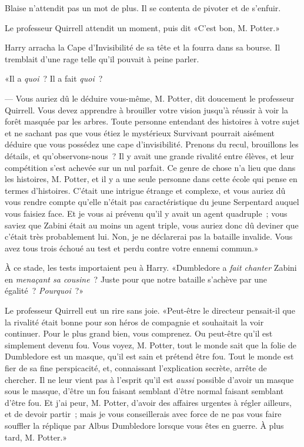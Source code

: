 Blaise n'attendit pas un mot de plus. Il se contenta de pivoter et de s'enfuir.

\later

Le professeur Quirrell attendit un moment, puis dit «C'est bon, M. Potter.»

Harry arracha la Cape d'Invisibilité de sa tête et la fourra dans sa bourse. Il tremblait d'une rage telle qu'il pouvait à peine parler.

«Il a \emph{quoi}~? Il a fait \emph{quoi}~?

--- Vous auriez dû le déduire vous-même, M. Potter, dit doucement le professeur Quirrell. Vous devez apprendre à brouiller votre vision jusqu'à réussir à voir la forêt masquée par les arbres. Toute personne entendant des histoires à votre sujet et ne sachant pas que vous étiez le mystérieux Survivant pourrait aisément déduire que vous possédez une cape d'invisibilité. Prenons du recul, brouillons les détails, et qu'observons-nous~? Il y avait une grande rivalité entre élèves, et leur compétition s'est achevée sur un nul parfait. Ce genre de chose n'a lieu que dans les histoires, M. Potter, et il y a une seule personne dans cette école qui pense en termes d'histoires. C'était une intrigue étrange et complexe, et vous auriez dû vous rendre compte qu'elle n'était pas caractéristique du jeune Serpentard auquel vous faisiez face. Et je vous ai prévenu qu'il y avait un agent quadruple~; vous saviez que Zabini était au moins un agent triple, vous auriez donc dû deviner que c'était très probablement lui. Non, je ne déclarerai pas la bataille invalide. Vous avez tous trois échoué au test et perdu contre votre ennemi commun.»

À ce stade, les tests importaient peu à Harry. «Dumbledore a \emph{fait chanter} Zabini en \emph{menaçant sa cousine}~? Juste pour que notre bataille s'achève par une égalité~? \emph{Pourquoi}~?»

Le professeur Quirrell eut un rire sans joie. «Peut-être le directeur pensait-il que la rivalité était bonne pour son héros de compagnie et souhaitait la voir continuer. Pour le plus grand bien, vous comprenez. Ou peut-être qu'il est simplement devenu fou. Vous voyez, M. Potter, tout le monde sait que la folie de Dumbledore est un masque, qu'il est sain et prétend être fou. Tout le monde est fier de sa fine perspicacité, et, connaissant l'explication secrète, arrête de chercher. Il ne leur vient pas à l'esprit qu'il est \emph{aussi} possible d'avoir un masque sous le masque, d'être un fou faisant semblant d'être normal faisant semblant d'être fou. Et j'ai peur, M. Potter, d'avoir des affaires urgentes à régler ailleurs, et de devoir partir~; mais je vous conseillerais avec force de ne pas vous faire souffler la réplique par Albus Dumbledore lorsque vous êtes en guerre. À plus tard, M. Potter.»


